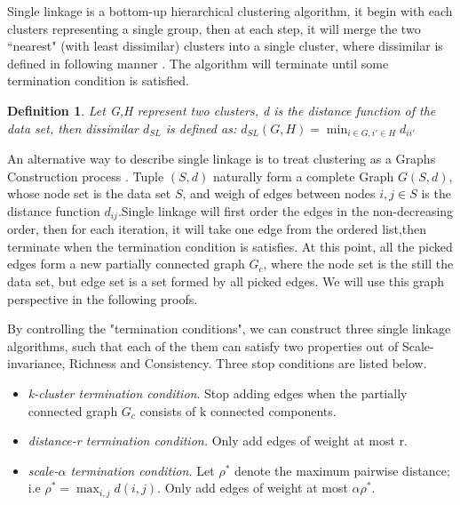 \documentclass{uonmathreport}
\newtheorem{definition}{Definition}[section]
\begin{document}
Single linkage is a bottom-up hierarchical clustering algorithm, it begin with each clusters representing a single group, then at each step, it will merge the two ``nearest" (with least dissimilar) clusters into a single cluster, where dissimilar is defined in following manner \cite{esl}. The algorithm will terminate until some termination condition is satisfied.
\begin{definition}
Let G,H represent two clusters, d is the distance function of the data set, then dissimilar $d_{SL}$ is defined as:
$d_{SL}(G,H) = \min_{i\in G,i'\in H}d_{ii'} $
\end{definition}

An alternative way to describe single linkage is to treat clustering as a Graphs Construction process \cite{christopher2008introduction}. Tuple $(S,d)$ naturally form a complete Graph $G(S,d)$, whose node set is  the data set $S$, and weigh of edges between nodes $i,j \in S$ is the distance function $d_{ij}$.Single linkage will first order the edges in the non-decreasing order, then for each iteration, it will take one edge from the ordered list,then terminate when the termination condition is satisfies. At this point, all the picked edges form a new partially connected graph $G_{c}$, where the node set is the still the data set, but edge set is a set formed by all picked edges. We will use this graph perspective in the following proofs.

By controlling the "termination conditions", we can construct three single linkage algorithms, such that each of the them can satisfy two properties out of Scale-invariance, Richness and Consistency. Three stop conditions are listed below\cite{Kleinberg}.
\begin{itemize}
\item \textit{k-cluster termination condition}. Stop adding edges when the partially connected graph $G_{c}$ consists of k connected components.
  
\item \textit{distance-r termination condition.} Only add edges of weight at most r.
  
\item \textit{scale-$\alpha$ termination condition.} Let $\rho^*$ denote the maximum pairwise distance; i.e $\rho^* = \max_{i,j}d(i,j)$. Only add edges of weight at most $\alpha\rho^{*}$.
\end{itemize}
\end{document}
